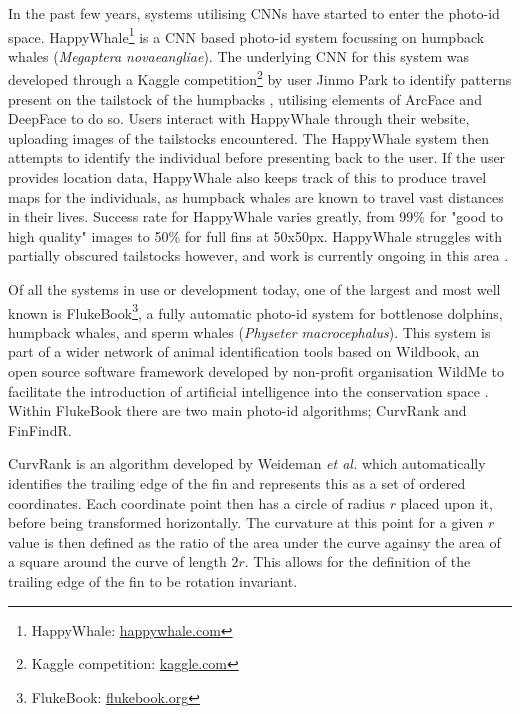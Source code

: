 In the past few years, systems utilising CNNs have started to enter the photo-id space. HappyWhale\footnote{HappyWhale: \href{https://happywhale.com/}{happywhale.com}} is a CNN based photo-id system focussing on humpback whales (\textit{Megaptera novaeangliae}). The underlying CNN for this system was developed through a Kaggle competition\footnote{Kaggle competition: \href{https://www.kaggle.com/c/whale-categorization-playground}{kaggle.com}} by user Jinmo Park to identify patterns present on the tailstock of the humpbacks \cite{kaggle_humpback_2018}, utilising elements of ArcFace \cite{deng_arcface_2019} and DeepFace \cite{taigman_deepface_2014} to do so. Users interact with HappyWhale through their website, uploading images of the tailstocks encountered. The HappyWhale system then attempts to identify the individual before presenting back to the user. If the user provides location data, HappyWhale also keeps track of this to produce travel maps for the individuals, as humpback whales are known to travel vast distances in their lives. Success rate for HappyWhale varies greatly, from 99\% for "good to high quality" images to 50\% for full fins at 50x50px. HappyWhale struggles with partially obscured tailstocks however, and work is currently ongoing in this area \cite{cheeseman_ted_2019}. 

Of all the systems in use or development today, one of the largest and most well known is FlukeBook\footnote{FlukeBook: \href{https://www.flukebook.org/}{flukebook.org}}, a fully automatic photo-id system for bottlenose dolphins, humpback whales, and sperm whales (\textit{Physeter macrocephalus}). This system is part of a wider network of animal identification tools based on Wildbook, an open source software framework developed by non-profit organisation WildMe to facilitate the introduction of artificial intelligence into the conservation space \cite{berger-wolf_wildbook:_2017}. Within FlukeBook there are two main photo-id algorithms; CurvRank and FinFindR.

CurvRank is an algorithm developed by Weideman \textit{et al.} \cite{weideman_integral_2017} which automatically identifies the trailing edge of the fin and represents this as a set of ordered coordinates. Each coordinate point then has a circle of radius $r$ placed upon it, before being transformed horizontally. The curvature at this point for a given $r$ value is then defined as the ratio of the area under the curve againsy the area of a square around the curve of length $2r$. This allows for the definition of the trailing edge of the fin to be rotation invariant. 

